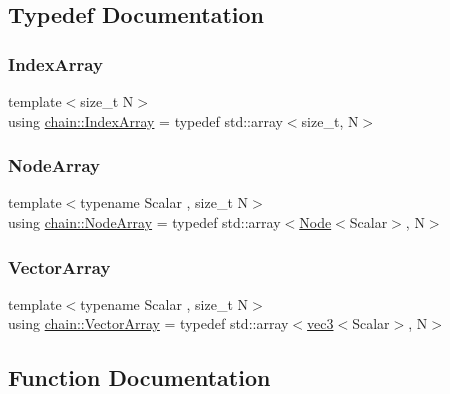 \subsection{Typedef Documentation}
\mbox{\label{namespacechain_aa40d2da395c0ac2bc5f37832442ac403}} 
\subsubsection{\texorpdfstring{Index\+Array}{IndexArray}}
{\footnotesize\ttfamily template$<$size\+\_\+t N$>$ \\
using \mbox{\hyperlink{namespacechain_aa40d2da395c0ac2bc5f37832442ac403}{chain\+::\+Index\+Array}} = typedef std\+::array$<$size\+\_\+t, N$>$}

\mbox{\label{namespacechain_a3a021b84403e03113e1dcd61ba304963}} 
\subsubsection{\texorpdfstring{Node\+Array}{NodeArray}}
{\footnotesize\ttfamily template$<$typename Scalar , size\+\_\+t N$>$ \\
using \mbox{\hyperlink{namespacechain_a3a021b84403e03113e1dcd61ba304963}{chain\+::\+Node\+Array}} = typedef std\+::array$<$\mbox{\hyperlink{structchain_1_1_node}{Node}}$<$Scalar$>$, N$>$}

\mbox{\label{namespacechain_aa715d2f046187ea9f0c3ea55605d6214}} 
\subsubsection{\texorpdfstring{Vector\+Array}{VectorArray}}
{\footnotesize\ttfamily template$<$typename Scalar , size\+\_\+t N$>$ \\
using \mbox{\hyperlink{namespacechain_aa715d2f046187ea9f0c3ea55605d6214}{chain\+::\+Vector\+Array}} = typedef std\+::array$<$\mbox{\hyperlink{structvec3}{vec3}}$<$Scalar$>$, N$>$}



\subsection{Function Documentation}
\mbox{\label{namespacechain_a68d5d08ece7d82a6b4bb1968b783a8f3}} 
